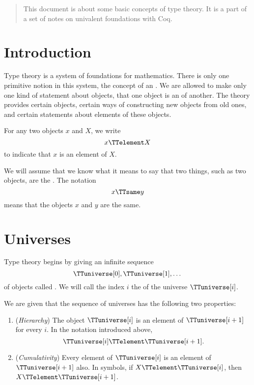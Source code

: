 \documentclass{article}
\begin{document}
\BNmakeTitle

\begin{abstract}
  This document is about some basic concepts of type theory.  It is a
  part of a set of notes on univalent foundations with Coq.
\end{abstract}

\tableofcontents

\section{Introduction}
\label{sec:introduction}

Type theory is a system of foundations for mathematics.  There is only
one primitive notion in this system, the concept of an
.  We are allowed to make only one kind of
statement about objects, that one object is an 
of another.  The theory provides certain objects, certain ways of
constructing new objects from old ones, and certain statements about
elements of these objects.

For any two objects $x$ and $X$, we write
\begin{equation*}
  x \TTelement X
\end{equation*}
to indicate that $x$ is an element of $X$.

We will assume that we know what it means to say that two things, such
as two objects, are the .  The notation
\begin{equation*}
  x \TTsame y
\end{equation*}
means that the objects $x$ and $y$ are the same.

\section{Universes}
\label{sec:universes}

Type theory begins by giving an infinite sequence
\begin{equation*}
  \TTuniverse[0], \TTuniverse[1], \dotsc
\end{equation*}
of objects called .  We will call the index $i$
the  of the universe $\TTuniverse[i]$.

We are given that the sequence of universes has the following two
properties:
\begin{enumerate}
\item \label{item:1} (\emph{Hierarchy}) The object $\TTuniverse[i]$ is
  an element of $\TTuniverse[i+1]$ for every $i$.  In the notation
  introduced above,
  \begin{equation*}
    \TTuniverse[i] \TTelement \TTuniverse[i+1].
  \end{equation*}
\item \label{item:2} (\emph{Cumulativity}) Every element of
  $\TTuniverse[i]$ is an element of $\TTuniverse[i+1]$ also.  In
  symbols, if $X \TTelement \TTuniverse[i]$, then
  $X \TTelement \TTuniverse[i+1]$.
\end{enumerate}
\end{document}
